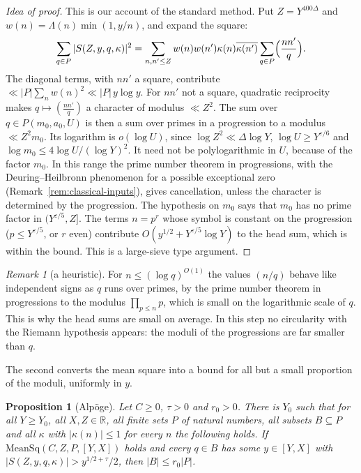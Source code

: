 \documentclass[11pt]{amsbook}
\theoremstyle{plain}
\newtheorem{proposition}[theorem]{Proposition}
\theoremstyle{definition}
\theoremstyle{remark}
\newtheorem{remark}[theorem]{Remark}
\numberwithin{equation}{section}
\numberwithin{figure}{chapter}
\numberwithin{table}{chapter}
\newcommand{\R}{\mathbb{R}}
\newcommand{\eps}{\varepsilon}
\begin{document}
\begin{proof}[Idea of proof]
This is our account of the standard method. Put $Z=Y^{400\Delta}$
and $w(n)=\Lambda(n)\min(1,y/n)$, and expand the square:
\[
\sum_{q\in P}|S(Z,y,q,\kappa)|^2=\sum_{n,n'\le Z}w(n)w(n')\kappa(n)
\overline{\kappa(n')}\sum_{q\in P}\Bigl(\frac{nn'}q\Bigr).
\]
The diagonal terms, with $nn'$ a square, contribute
$\ll|P|\sum_nw(n)^2\ll|P|\,y\log y$. For $nn'$ not a square,
quadratic reciprocity makes $q\mapsto(\frac{nn'}q)$ a character of
modulus $\ll Z^2$. The sum over $q\in P(m_0,a_0,U)$ is then a sum
over primes in a progression to a modulus $\ll Z^2m_0$. Its logarithm
is $o(\log U)$, since $\log Z^2\ll\Delta\log Y$, $\log U\ge Y^{\eps/6}$
and $\log m_0\le4\log U/(\log Y)^2$. It need not be polylogarithmic
in $U$, because of the factor $m_0$. In this range the prime number
theorem in progressions, with the Deuring--Heilbronn phenomenon for a
possible exceptional zero (Remark~\ref{rem:classical-inputs}), gives
cancellation, unless the character is determined by the
progression. The hypothesis on $m_0$ says that $m_0$
has no prime factor in $(Y^{\eps/5},Z]$. The terms $n=p^r$ whose
symbol is constant on the progression ($p\le Y^{\eps/5}$, or $r$
even) contribute $O(y^{1/2}+Y^{\eps/5}\log Y)$ to the head sum,
which is within the bound. This is a large-sieve type argument.
\end{proof}

\begin{remark}[a heuristic]\label{rem:indep-signs}
For $n\le(\log q)^{O(1)}$ the values $(n/q)$ behave like independent
signs as $q$ runs over primes, by the prime number theorem in
progressions to the modulus $\prod_{p\le n}p$, which is small on the
logarithmic scale of $q$. This is why the head sums are small on
average. In this step no circularity with the Riemann hypothesis
appears: the moduli of the progressions are far smaller than $q$.
\end{remark}

The second converts the mean square into a bound for all but a small
proportion of the moduli, uniformly in $y$.

\begin{proposition}[Alp\"oge]\label{prop:bad-moduli}
Let $C\ge0$, $\tau>0$ and $r_0>0$. There is $Y_0$ such that for all
$Y\ge Y_0$, all $X,Z\in\R$, all finite sets $P$ of natural numbers,
all subsets $B\subseteq P$ and all $\kappa$ with $|\kappa(n)|\le1$ for every
$n$ the
following holds. If $\mathrm{MeanSq}(C,Z,P,[Y,X])$ holds and every
$q\in B$ has some $y\in[Y,X]$ with $|S(Z,y,q,\kappa)|>y^{1/2+\tau}/2$,
then $|B|\le r_0|P|$.
\end{proposition}
\end{document}
